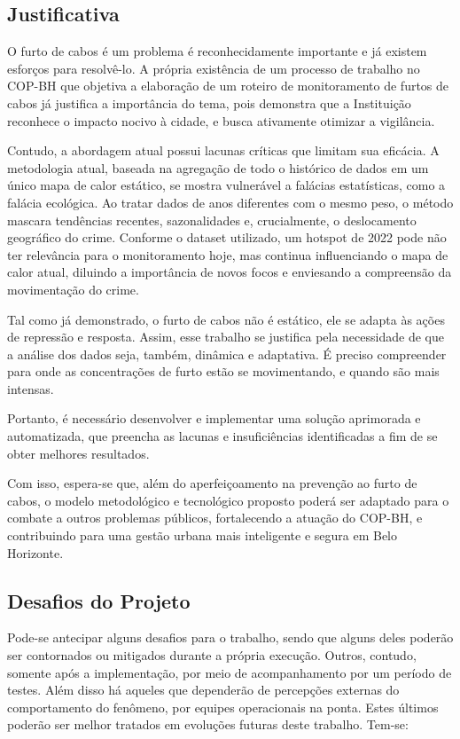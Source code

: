 \subsection{Justificativa}

O furto de cabos é um problema é reconhecidamente importante e já existem esforços para resolvê-lo. A própria existência de um processo de trabalho no COP-BH que objetiva a elaboração de um roteiro de monitoramento de furtos de cabos já justifica a importância do tema, pois demonstra que a Instituição reconhece o impacto nocivo à cidade, e busca ativamente otimizar a vigilância.

Contudo, a abordagem atual possui lacunas críticas que limitam sua eficácia. A metodologia atual, baseada na agregação de todo o histórico de dados em um único mapa de calor estático, se mostra vulnerável a falácias estatísticas, como a falácia ecológica. Ao tratar dados de anos diferentes com o mesmo peso, o método mascara tendências recentes, sazonalidades e, crucialmente, o deslocamento geográfico do crime. Conforme o dataset utilizado, um hotspot de 2022 pode não ter relevância para o monitoramento hoje, mas continua influenciando o mapa de calor atual, diluindo a importância de novos focos e enviesando a compreensão da movimentação do crime.

Tal como já demonstrado, o furto de cabos não é estático, ele se adapta às ações de repressão e resposta. Assim, esse trabalho se justifica pela necessidade de que a análise dos dados seja, também, dinâmica e adaptativa. É preciso compreender para onde as concentrações de furto estão se movimentando, e quando são mais intensas.

Portanto, é necessário desenvolver e implementar uma solução aprimorada e automatizada, que preencha as lacunas e insuficiências identificadas a fim de se obter melhores resultados.

Com isso, espera-se que, além do aperfeiçoamento na prevenção ao furto de cabos, o modelo metodológico e tecnológico proposto poderá ser adaptado para o combate a outros problemas públicos, fortalecendo a atuação do COP-BH, e contribuindo para uma gestão urbana mais inteligente e segura em Belo Horizonte.

\subsection{Desafios do Projeto}

Pode-se antecipar alguns desafios para o trabalho, sendo que alguns deles poderão ser contornados ou mitigados durante a própria execução. Outros, contudo, somente após a implementação, por meio de acompanhamento por um período de testes. Além disso há aqueles que dependerão de percepções externas do comportamento do fenômeno, por equipes operacionais na ponta. Estes últimos poderão ser melhor tratados em evoluções futuras deste trabalho. Tem-se:

